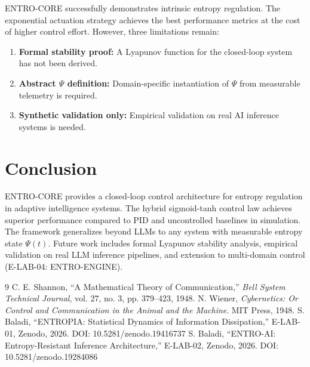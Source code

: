 \documentclass[twocolumn]{article}
\begin{document}
ENTRO-CORE successfully demonstrates intrinsic entropy regulation. The exponential actuation strategy achieves the best performance metrics at the cost of higher control effort. However, three limitations remain:

\begin{enumerate}
\item \textbf{Formal stability proof:} A Lyapunov function for the closed-loop system has not been derived.
\item \textbf{Abstract \(\Psi\) definition:} Domain-specific instantiation of \(\Psi\) from measurable telemetry is required.
\item \textbf{Synthetic validation only:} Empirical validation on real AI inference systems is needed.
\end{enumerate}

\section{Conclusion}

ENTRO-CORE provides a closed-loop control architecture for entropy regulation in adaptive intelligence systems. The hybrid sigmoid-tanh control law achieves superior performance compared to PID and uncontrolled baselines in simulation. The framework generalizes beyond LLMs to any system with measurable entropy state \(\Psi(t)\). Future work includes formal Lyapunov stability analysis, empirical validation on real LLM inference pipelines, and extension to multi-domain control (E-LAB-04: ENTRO-ENGINE).

\begin{thebibliography}{9}
 C. E. Shannon, ``A Mathematical Theory of Communication,'' \textit{Bell System Technical Journal}, vol. 27, no. 3, pp. 379–423, 1948.
 N. Wiener, \textit{Cybernetics: Or Control and Communication in the Animal and the Machine}. MIT Press, 1948.
 S. Baladi, ``ENTROPIA: Statistical Dynamics of Information Dissipation,'' E-LAB-01, Zenodo, 2026. DOI: 10.5281/zenodo.19416737
 S. Baladi, ``ENTRO-AI: Entropy-Resistant Inference Architecture,'' E-LAB-02, Zenodo, 2026. DOI: 10.5281/zenodo.19284086
\end{thebibliography}
\end{document}

